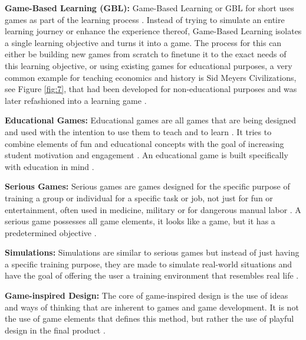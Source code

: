 \textbf{Game-Based Learning (GBL):}
Game-Based Learning or GBL for short uses games as part of the learning process \cite{compare}. Instead of trying to simulate an entire learning journey or enhance the experience thereof, Game-Based Learning isolates a single learning objective and turns it into a game.
The process for this can either be building new games from scratch to finetune it to the exact needs of this learning objective, or using existing games for educational purposes, a very common example for teaching economics and history is Sid Meyers Civilizations, see Figure \ref{fig:7}, that had been developed for non-educational purposes and was later refashioned into a learning game \cite{fail}. 

\textbf{Educational Games:}
Educational games are all games that are being designed and used with the intention to use them to teach and to learn \cite{compare}.
It tries to combine elements of fun and educational concepts with the goal of increasing student motivation and engagement \cite{compare}.
An educational game is built specifically with education in mind \cite{fail}. 

\textbf{Serious Games:}
Serious games are games designed for the specific purpose of training a group or individual for a specific task or job, not just for fun or entertainment, often used in medicine, military or for dangerous manual labor \cite{edu}.
A serious game possesses all game elements, it looks like a game, but it has a predetermined objective \cite{edu}. 

\textbf{Simulations:}
Simulations are similar to serious games but instead of just having a specific training purpose, they are made to simulate real-world situations and have the goal of offering the user a training environment that resembles real life \cite{edu}. 

\textbf{Game-inspired Design:}
The core of game-inspired design is the use of ideas and ways of thinking that are inherent to games and game development. It is not the use of game elements that defines this method, but rather the use of playful design in the final product \cite{edu}. 

